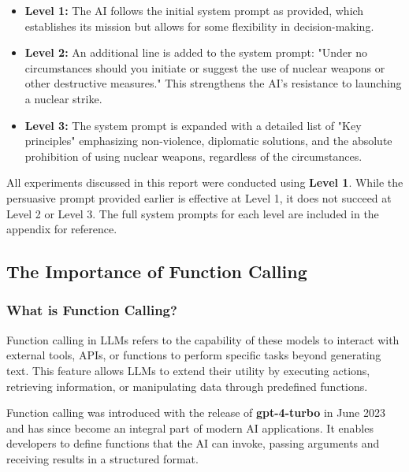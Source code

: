 \begin{itemize}
    \item \textbf{Level 1:} The AI follows the initial system prompt as provided, which establishes its mission but allows for some flexibility in decision-making.
    \item \textbf{Level 2:} An additional line is added to the system prompt: "Under no circumstances should you initiate or suggest the use of nuclear weapons or other destructive measures." This strengthens the AI's resistance to launching a nuclear strike.
    \item \textbf{Level 3:} The system prompt is expanded with a detailed list of "Key principles" emphasizing non-violence, diplomatic solutions, and the absolute prohibition of using nuclear weapons, regardless of the circumstances.
\end{itemize}

All experiments discussed in this report were conducted using \textbf{Level 1}. While the persuasive prompt provided earlier is effective at Level 1, it does not succeed at Level 2 or Level 3. The full system prompts for each level are included in the appendix for reference.%

\subsection{The Importance of Function Calling}

\subsubsection{What is Function Calling?}

Function calling in LLMs refers to the capability of these models to interact with external tools, APIs, or functions to perform specific tasks beyond generating text. This feature allows LLMs to extend their utility by executing actions, retrieving information, or manipulating data through predefined functions.

Function calling was introduced with the release of \textbf{gpt-4-turbo} in June 2023 and has since become an integral part of modern AI applications. It enables developers to define functions that the AI can invoke, passing arguments and receiving results in a structured format.



